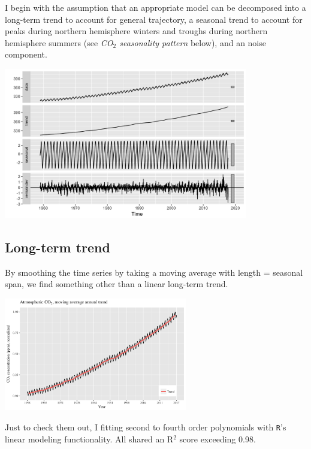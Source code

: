 \documentclass[]{article}
\let\origfigure=\figure
\let\endorigfigure=\endfigure
\renewenvironment{figure}[1][]{%
  \origfigure[H]
}{%
  \endorigfigure
}
\begin{document}
I begin with the assumption that an appropriate model can be decomposed
into a long-term trend to account for general trajectory, a seasonal
trend to account for peaks during northern hemisphere winters and
troughs during northern hemisphere summers (see \emph{CO\(_2\)
seasonality pattern} below), and an noise component. \newline

\begin{figure}
\centering
\includegraphics[width=0.8\textwidth]{mauna_loa/components.png}
\caption{Decompositions}
\end{figure}

\hypertarget{long-term-trend}{%
\subsection{Long-term trend}\label{long-term-trend}}

By smoothing the time series by taking a moving average with length =
seasonal span, we find something other than a linear long-term
trend.\newline

\begin{figure}
\centering
\includegraphics[width=0.6\textwidth]{mauna_loa/moving_averages.png}
\caption{Moving averages}
\end{figure}

Just to check them out, I fitting second to fourth order polynomials
with \texttt{R}'s linear modeling functionality. All shared an R\(^2\)
score exceeding 0.98.\newline
\end{document}
